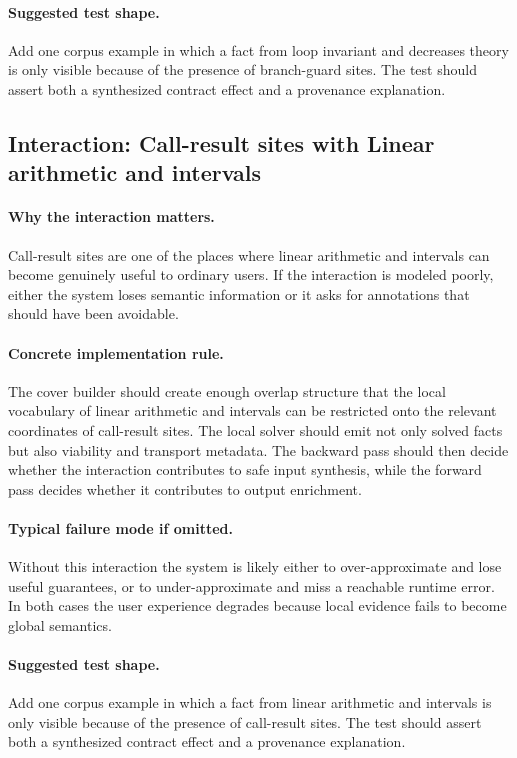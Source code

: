 \documentclass[11pt]{report}
\theoremstyle{definition}
\theoremstyle{plain}
\begin{document}
\paragraph{Suggested test shape.}
Add one corpus example in which a fact from loop invariant and decreases theory is only
visible because of the presence of branch-guard sites. The test should
assert both a synthesized contract effect and a provenance explanation.

\subsection{Interaction: Call-result sites with Linear arithmetic and intervals}

\paragraph{Why the interaction matters.}
Call-result sites are one of the places where linear arithmetic and intervals can become
genuinely useful to ordinary users. If the interaction is modeled poorly,
either the system loses semantic information or it asks for annotations that
should have been avoidable.

\paragraph{Concrete implementation rule.}
The cover builder should create enough overlap structure that the local
vocabulary of linear arithmetic and intervals can be restricted onto the relevant
coordinates of call-result sites. The local solver should emit not only
solved facts but also viability and transport metadata. The backward pass
should then decide whether the interaction contributes to safe input
synthesis, while the forward pass decides whether it contributes to output
enrichment.

\paragraph{Typical failure mode if omitted.}
Without this interaction the system is likely either to over-approximate and
lose useful guarantees, or to under-approximate and miss a reachable runtime
error. In both cases the user experience degrades because local evidence
fails to become global semantics.

\paragraph{Suggested test shape.}
Add one corpus example in which a fact from linear arithmetic and intervals is only
visible because of the presence of call-result sites. The test should
assert both a synthesized contract effect and a provenance explanation.
\end{document}
